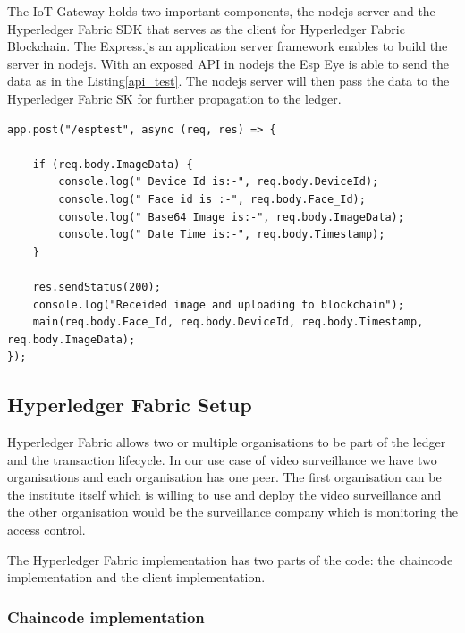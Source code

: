 The IoT Gateway holds two important components, the nodejs server and the Hyperledger Fabric SDK that serves as the client for Hyperledger Fabric Blockchain. The Express.js an application server framework enables to build the server in nodejs. With an exposed API in nodejs the Esp Eye is able to send the data as in the Listing\ref{api_test}. The nodejs server will then pass the data to the Hyperledger Fabric SK for further propagation to the ledger.



\begin{lstlisting}[caption={The exposed API for handling requests coming from Esp Eye.},label=api_test, captionpos=b]
app.post("/esptest", async (req, res) => {

    if (req.body.ImageData) {
        console.log(" Device Id is:-", req.body.DeviceId);
        console.log(" Face id is :-", req.body.Face_Id);
        console.log(" Base64 Image is:-", req.body.ImageData);
        console.log(" Date Time is:-", req.body.Timestamp);
    }

    res.sendStatus(200);
    console.log("Receided image and uploading to blockchain");
    main(req.body.Face_Id, req.body.DeviceId, req.body.Timestamp, req.body.ImageData);
});
\end{lstlisting}



\subsection{Hyperledger Fabric Setup}
Hyperledger Fabric allows two or multiple organisations to be part of the ledger and the transaction lifecycle. In our use case of video surveillance we have two organisations and each organisation has one peer. The first organisation can be the institute itself which is willing to use and deploy the video surveillance and the other organisation would be the surveillance company which is monitoring the access control. 

The Hyperledger Fabric implementation has two parts of the code: the chaincode implementation and the client implementation. 

\subsubsection{Chaincode implementation}

